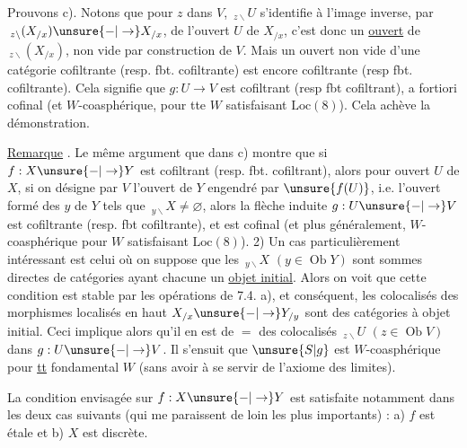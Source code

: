 Prouvons c). Notons que pour $z$ dans $V$,
$\,{}_{z\backslash}U$ s'identifie à l'image inverse, par $\,{}_{z\backslash}(X_{/x})\unsure{-|\to}X_{/x}$,
de l'ouvert $U$ de $X_{/x}$, c'est donc un
\uline{ouvert} de $\,{}_{z\backslash}(X_{/x})$, non vide par construction
de $V$. Mais un ouvert non vide d'une
catégorie cofiltrante (resp. fbt. cofiltrante)
est encore cofiltrante (resp fbt. cofiltrante).
Cela signifie que $g:U\longrightarrow V$ est cofiltrant
(resp fbt cofiltrant), a fortiori cofinal
(et $W$-coasphérique, pour tte $W$ satisfaisant
$\mathrm{Loc}(8)$). Cela achève la démonstration.

\uline{Remarque} . Le même argument que dans
c) montre que si $f:X\unsure{-|\to}Y$ est
cofiltrant (resp. fbt. cofiltrant), alors
pour  ouvert $U$ de $X$, si on
désigne par $V$ l'ouvert de $Y$  engendré
par $\unsure{f(U)}$, i.e. l'ouvert formé des $y$
de $Y$ tels que $\,{}_{y\backslash}X\ne\varnothing$, alors la
flèche induite $g:U\unsure{-|\to}V$ est cofiltrante
(resp. fbt cofiltrante), et 
est cofinal (et plus généralement, 
$W$-coasphérique pour  $W$ satisfaisant
 $\mathrm{Loc}(8)$).
2) Un cas particulièrement intéressant 
est celui où on suppose que les $\,{}_{y\backslash}X$ $(y\in\operatorname{Ob}Y)$
sont  sommes directes de catégories
ayant chacune un \uline{objet initial}. Alors
on voit que cette condition est stable par
les opérations de 7.4. a), et 
conséquent, les colocalisés  des morphismes
localisés en haut $X_{/x}\unsure{-|\to}Y_{/y}$ sont des
catégories à objet initial. Ceci  implique alors qu'il en est de
$=$ des colocalisés $\,{}_{z\backslash}U$ $(z\in\operatorname{Ob}V)$ dans
$g:U\unsure{-|\to}V$. Il s'ensuit que $\unsure{S|g}$ est
$W$-coasphérique pour \uline{tt}  
fondamental $W$ (sans avoir à se servir
de l'axiome des limites).

La condition envisagée sur $f:X\unsure{-|\to}Y$
est satisfaite notamment dans les
deux cas suivants (qui me paraissent
de loin les plus importants) : a) $f$ est
étale et b) $X$ est discrète.

